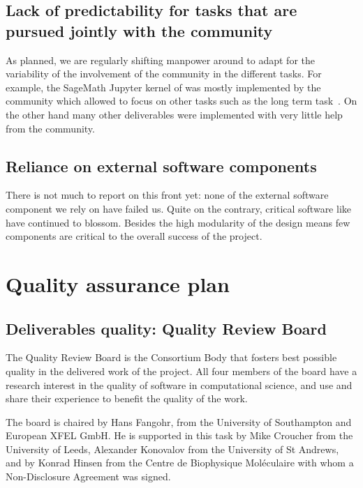 \documentclass{deliverablereport}
\begin{document}
\subsection{Lack of predictability for tasks that are pursued jointly
  with the community}

As planned, we are regularly shifting manpower around to adapt for the
variability of the involvement of the community in the different
tasks. For example, the SageMath Jupyter kernel of
 was mostly implemented by the
community which allowed to focus on other tasks such as the long term
task~.  On
the other hand many other deliverables were implemented with very
little help from the community.

\subsection{Reliance on external software components}

There is not much to report on this front yet: none of the external
software component we rely on have failed us. Quite on the contrary,
critical software like \Jupyter have continued to blossom. Besides the
high modularity of the design means few components are critical to the
overall success of the project.

\section{Quality assurance plan}

\subsection{Deliverables quality: Quality Review Board}

The Quality Review Board is the Consortium Body that fosters best
possible quality in the delivered work of the project.
All four members of the board
have a research interest in the quality of software in computational
science, and use and share their experience to benefit the quality of
the work.

The board is chaired by Hans Fangohr, from the University of
Southampton and European XFEL GmbH. He is supported in this task by
Mike Croucher from the University of Leeds, Alexander Konovalov from
the University of St Andrews, and by Konrad Hinsen from the Centre de
Biophysique Moléculaire with whom a Non-Disclosure Agreement was
signed.
\end{document}
